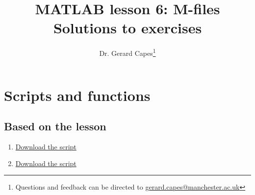 \documentclass{article}
\title{MATLAB lesson 6: M-files\\Solutions to exercises}
\date{}
\author{Dr. Gerard Capes\thanks{Questions and feedback can be directed to \href{mailto:gerard.capes@manchester.ac.uk?subject=Feedback on MATLAB m-files exercise sheet}{gerard.capes@manchester.ac.uk}}}
\begin{document}
	\maketitle
	
	\section{Scripts and functions}
	\subsection*{Based on the lesson}
		\begin{enumerate}
			\item \href{https://github.com/UoMResearchIT/MATLAB-online-exercises/raw/master/lesson6_mfiles/q1.m}{Download the script}
			
			\item \href{https://github.com/UoMResearchIT/MATLAB-online-exercises/raw/master/lesson6_mfiles/q2.m}{Download the script}

		\end{enumerate}
\end{document}
